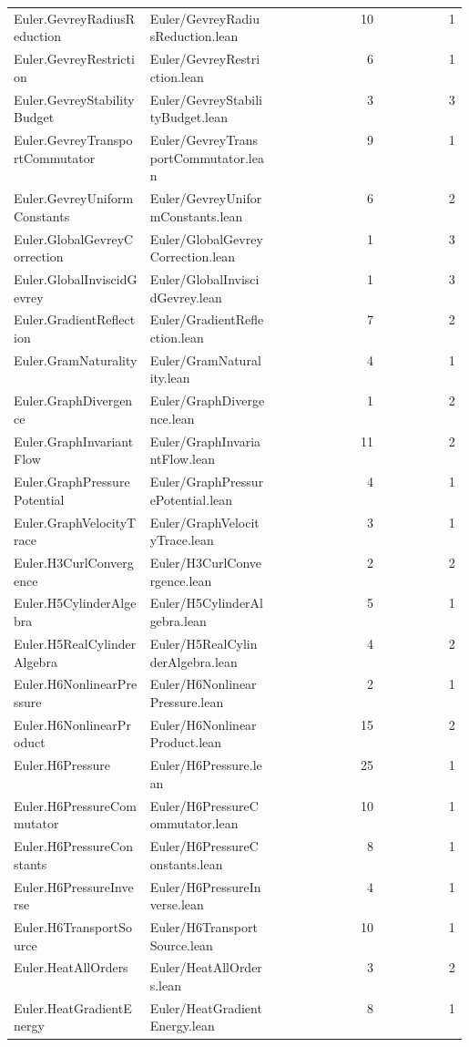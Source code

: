 \begin{longtable}{p{0.30\linewidth}p{0.28\linewidth}rr}
Euler.GevreyRadiusReduction & Euler/GevreyRadiusReduction.lean & 10 & 1\\
Euler.GevreyRestriction & Euler/GevreyRestriction.lean & 6 & 1\\
Euler.GevreyStabilityBudget & Euler/GevreyStabilityBudget.lean & 3 & 3\\
Euler.GevreyTransportCommutator & Euler/GevreyTransportCommutator.lean & 9 & 1\\
Euler.GevreyUniformConstants & Euler/GevreyUniformConstants.lean & 6 & 2\\
Euler.GlobalGevreyCorrection & Euler/GlobalGevreyCorrection.lean & 1 & 3\\
Euler.GlobalInviscidGevrey & Euler/GlobalInviscidGevrey.lean & 1 & 3\\
Euler.GradientReflection & Euler/GradientReflection.lean & 7 & 2\\
Euler.GramNaturality & Euler/GramNaturality.lean & 4 & 1\\
Euler.GraphDivergence & Euler/GraphDivergence.lean & 1 & 2\\
Euler.GraphInvariantFlow & Euler/GraphInvariantFlow.lean & 11 & 2\\
Euler.GraphPressurePotential & Euler/GraphPressurePotential.lean & 4 & 1\\
Euler.GraphVelocityTrace & Euler/GraphVelocityTrace.lean & 3 & 1\\
Euler.H3CurlConvergence & Euler/H3CurlConvergence.lean & 2 & 2\\
Euler.H5CylinderAlgebra & Euler/H5CylinderAlgebra.lean & 5 & 1\\
Euler.H5RealCylinderAlgebra & Euler/H5RealCylinderAlgebra.lean & 4 & 2\\
Euler.H6NonlinearPressure & Euler/H6NonlinearPressure.lean & 2 & 1\\
Euler.H6NonlinearProduct & Euler/H6NonlinearProduct.lean & 15 & 2\\
Euler.H6Pressure & Euler/H6Pressure.lean & 25 & 1\\
Euler.H6PressureCommutator & Euler/H6PressureCommutator.lean & 10 & 1\\
Euler.H6PressureConstants & Euler/H6PressureConstants.lean & 8 & 1\\
Euler.H6PressureInverse & Euler/H6PressureInverse.lean & 4 & 1\\
Euler.H6TransportSource & Euler/H6TransportSource.lean & 10 & 1\\
Euler.HeatAllOrders & Euler/HeatAllOrders.lean & 3 & 2\\
Euler.HeatGradientEnergy & Euler/HeatGradientEnergy.lean & 8 & 1\\

\end{longtable}

